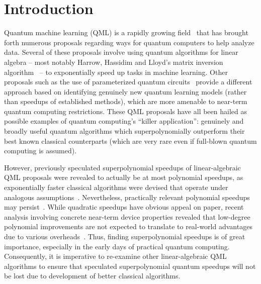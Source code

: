 \documentclass[a4paper, onecolumn, accepted=2022-08-28]{quantumarticle}
\begin{document}
\maketitle

\section{Introduction
  \label{sec:intro}}

Quantum machine learning (QML) is a rapidly growing %
field~\cite{dunjko:review, biamonte:review} that has brought forth numerous proposals regarding ways for quantum computers to help analyze data.
Several of these proposals involve using quantum algorithms for linear algebra -- most notably Harrow, Hassidim and Lloyd's matrix inversion algorithm~\cite{harrow:hhl} -- to exponentially speed up tasks in machine learning.
Other proposals such as the use of parameterized quantum circuits~\cite{havlivcek:pqcs, schuld:pqcs, benedetti:pqcs} provide a different approach based on identifying genuinely new quantum learning models (rather than speedups of established methods), which are more amenable to near-term quantum computing restrictions.
These QML proposals have all been hailed as possible examples of quantum computing's ``killer application'': genuinely and broadly useful quantum algorithms which superpolynomially outperform their best known classical counterparts (which are very rare even if full-blown quantum computing is assumed).

However, previously speculated superpolynomial speedups of linear-algebraic QML proposals were revealed to actually be at most polynomial speedups, as exponentially faster classical algorithms were devised that operate under analogous assumptions~\cite{tang:dequantization, chia:dequantizations}.
Nevertheless, practically relevant polynomial speedups may persist~\cite{kerenidis:qrs, lloyd:qpca}. 
While quadratic speedups have obvious appeal on paper, recent analysis involving concrete near-term device properties revealed that low-degree polynomial improvements are not expected to translate to real-world advantages due to various overheads~\cite{babbush:poly_speedup}.
Thus, finding  superpolynomial speedups is of great importance, especially in the early days of practical quantum computing. 
Consequently, it is imperative to re-examine other linear-algebraic QML algorithms to ensure that speculated superpolynomial quantum speedups will not be lost due to development of better classical algorithms.
\end{document}
